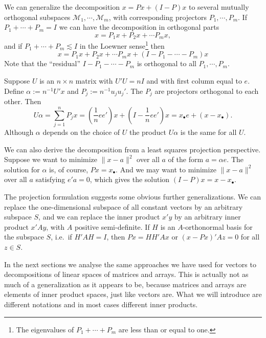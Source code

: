 \documentclass[
  12pt,
  letterpaper,
  DIV=11,
  numbers=noendperiod]{scrartcl}
\begin{document}
We can generalize the decomposition \(x=Px+(I-P)x\) to several mutually
orthogonal subspaces \(\mathcal{M}_1,\cdots,\mathcal{M}_m\), with
corresponding projectors \(P_1,\cdots,P_m\). If \(P_1+\cdots+P_m=I\) we
can have the decomposition in orthogonal parts \begin{equation}
x=P_1x+P_2x+\cdots P_mx,
\end{equation} and if \(P_1+\cdots+P_m\lesssim I\) in the Loewner
sense\footnote{The eigenvalues of $P_1+\cdots+P_m$ are less than or equal to one.}
then \begin{equation}
x=P_1x+P_2x+\cdots P_mx+(I-P_1-\cdots-P_m)x
\end{equation} Note that the ``residual'' \(I-P_1-\cdots-P_m\) is
orthogonal to all \(P_1,\cdots,P_m\).

Suppose \(U\) is an \(n\times n\) matrix with \(U'U=nI\) and with first
column equal to \(e\). Define \(\alpha:=n^{-1}U'x\) and
\(P_j:=n^{-1}u_ju_j'\). The \(P_j\) are projectors orthogonal to each
other. Then \begin{equation}
U\alpha=\sum_{j=1}^nP_jx=(\frac{1}{n}ee')x+(I-\frac{1}{n}ee')x=x_\bullet e+(x-x_\bullet).
\end{equation} Although \(\alpha\) depends on the choice of \(U\) the
product \(U\alpha\) is the same for all \(U\).

We can also derive the decomposition from a least squares projection
perspective. Suppose we want to minimize \(\|x-a\|^2\) over all \(a\) of
the form \(a=\alpha e\). The solution for \(\alpha\) is, of course,
\(Px=x_\bullet\). And we may want to minimize \(\|x-a\|^2\) over all
\(a\) satisfying \(e'a=0\), which gives the solution
\((I-P)x=x-x_\bullet\).

The projection formulation suggests some obvious further
generalizations. We can replace the one-dimensional subspace of all
constant vectors by an arbitrary subspace \(S\), and we can replace the
inner product \(x'y\) by an arbitrary inner product \(x'Ay\), with \(A\)
positive semi-definite. If \(H\) is an \(A\)-orthonormal basis for the
subspace \(S\), i.e.~if \(H'AH=I\), then \(Px=HH'Ax\) or \((x-Px)'Az=0\)
for all \(z\in S\).

In the next sections we analyse the same approaches we have used for
vectors to decompositions of linear spaces of matrices and arrays. This
is actually not as much of a generalization as it appears to be, because
matrices and arrays are elements of inner product spaces, just like
vectors are. What we will introduce are different notations and in most
cases different inner products.
\end{document}
